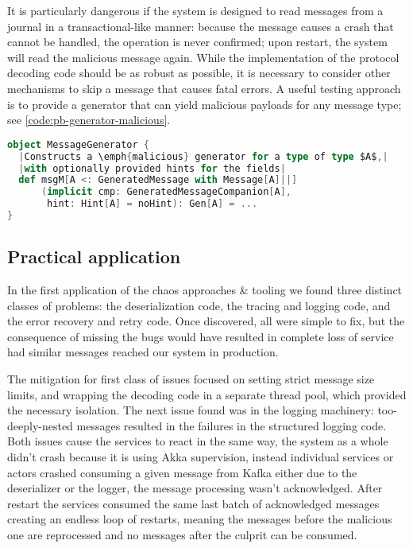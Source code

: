 It is particularly dangerous if the system is designed to read messages from a journal in a transactional-like manner: because the message causes a crash that cannot be handled, the  operation is never confirmed; upon restart, the system will read the malicious message again. While the implementation of the protocol decoding code should be as robust as possible, it is necessary to consider other mechanisms to skip a message that causes fatal errors. A useful testing approach is to provide a generator that can yield malicious payloads for any message type; see \autoref{code:pb-generator-malicious}.

\begin{lstlisting}[caption={Malicious Generator}, label={code:pb-generator-malicious}, language=Scala, escapechar=|]
object MessageGenerator {
  |Constructs a \emph{malicious} generator for a type of type $A$,|
  |with optionally provided hints for the fields|
  def msgM[A <: GeneratedMessage with Message[A]||]
      (implicit cmp: GeneratedMessageCompanion[A], 
       hint: Hint[A] = noHint): Gen[A] = ...
}
\end{lstlisting}

\subsection{Practical application}
In the first application of the chaos approaches \& tooling we found three distinct classes of problems: the deserialization code, the tracing and logging code, and the error recovery and retry code. Once discovered, all were simple to fix, but the consequence of missing the bugs would have resulted in complete loss of service had similar messages reached our system in production.

The mitigation for first class of issues focused on setting strict message size limits, and wrapping the decoding code in a separate thread pool, which provided the necessary isolation. The next issue found was in the logging machinery: too-deeply-nested messages resulted in the failures in the structured logging code. Both issues cause the services to react in the same way, the system as a whole didn't crash because it is using Akka supervision, instead individual services or actors crashed consuming a given message from Kafka either due to the deserializer or the logger, the message processing wasn't acknowledged. After restart the services consumed the same last batch of acknowledged messages creating an endless loop of restarts, meaning the messages before the malicious one are reprocessed and no messages after the culprit can be consumed. 

\printbibliography


